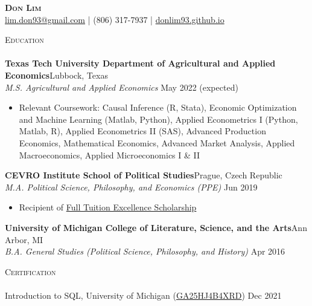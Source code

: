 \documentclass[a4paper,11pt]{article}
\newcommand{\lineunder} {
    \vspace*{-8pt} \\
    \hspace*{-18pt} \hrulefill \\
}
\newcommand{\header} [1] {
    {\hspace*{-18pt}\vspace*{6pt} \textsc{\large{#1}}}
    \vspace*{-6pt} \lineunder
}
\begin{document}
\vspace*{-40pt}

\vspace*{-10pt}
\begin{center}
    {\Huge \scshape \textbf{{Don Lim}}}\\
    \href{mailto:lim.don93@gmail.com}{lim.don93@gmail.com} | (806) 317-7937 | \href{https://donlim93.github.io/}{donlim93.github.io} \\
\end{center}

\header{Education}
\textbf{Texas Tech University Department of Agricultural and Applied Economics}\hfill Lubbock, Texas\\
\textit{M.S. Agricultural and Applied Economics} \hfill May 2022 (expected)\\
\begin{itemize}[noitemsep,nolistsep]
    \item Relevant Coursework: Causal Inference (R, Stata), Economic Optimization and Machine Learning (Matlab, Python), Applied Econometrics I (Python, Matlab, R), Applied Econometrics II (SAS), Advanced Production Economics, Mathematical Economics, Advanced Market Analysis, Applied Macroeconomics, Applied Microeconomics I \& II
\end{itemize}

\textbf{CEVRO Institute School of Political Studies}\hfill Prague, Czech Republic\\
\textit{M.A. Political Science, Philosophy, and Economics (PPE)} \hfill Jun 2019\\
\begin{itemize}[noitemsep,nolistsep]
    \item Recipient of \href{http://www.cevroinstitut.cz/en/article/scholarships/}{Full Tuition Excellence Scholarship}
\end{itemize}

\textbf{University of Michigan College of Literature, Science, and the Arts}\hfill Ann Arbor, MI\\
\textit{B.A. General Studies (Political Science, Philosophy, and History)} \hfill Apr 2016\\

\vspace{1mm}
\header{Certification}

Introduction to SQL, University of Michigan (\href{https://coursera.org/verify/GA25HJ4B4XRD}{GA25HJ4B4XRD}) \hfill Dec 2021
\end{document}
